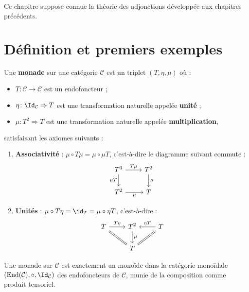 Ce chapitre suppose connue la théorie des adjonctions développée
aux chapitres précédents.

\section{Définition et premiers exemples}\label{sec:monades-def}

\begin{definition}[Monade]\label{def:monade}
Une \textbf{monade} sur une catégorie $\mathcal{C}$ est un triplet
$(T, \eta, \mu)$ où :
\begin{itemize}
    \item $T \colon \mathcal{C} \to \mathcal{C}$ est un endofoncteur ;
    \item $\eta \colon \Id_{\mathcal{C}} \Rightarrow T$ est une
    transformation naturelle appelée \textbf{unité} ;
    \item $\mu \colon T^2 \Rightarrow T$ est une transformation naturelle
    appelée \textbf{multiplication},
\end{itemize}
satisfaisant les axiomes suivants :
\begin{enumerate}[label=(\roman*)]
\item \textbf{Associativité} :
    $\mu \circ T\mu = \mu \circ \mu T$, c'est-à-dire le diagramme
    suivant commute :
\[
\begin{tikzcd}
T^3 \arrow[r, "T\mu"] \arrow[d, "\mu T"'] & T^2 \arrow[d, "\mu"] \\
T^2 \arrow[r, "\mu"'] & T
\end{tikzcd}
\]

\item \textbf{Unités} :
    $\mu \circ T\eta = \id_T = \mu \circ \eta T$, c'est-à-dire :
\[
\begin{tikzcd}
T \arrow[r, "T\eta"] \arrow[dr, equal] & T^2 \arrow[d, "\mu"] &
T \arrow[l, "\eta T"'] \arrow[dl, equal] \\
& T &
\end{tikzcd}
\]
\end{enumerate}
\end{definition}

\begin{remarque}\label{rem:monade-monoide}
Une monade sur $\mathcal{C}$ est exactement un monoïde dans la catégorie
monoïdale $(\mathrm{End}(\mathcal{C}), \circ, \Id_{\mathcal{C}})$
des endofoncteurs de $\mathcal{C}$, munie de la composition comme produit
tensoriel.
\end{remarque}

